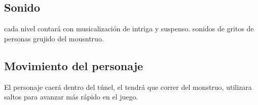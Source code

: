 \documentclass{article}
\begin{document}
\subsection{Sonido}
%
cada nivel contará con musicalización de intriga y suspenso.
sonidos de gritos de personas
grujido del mousntruo.

\subsection{Movimiento del personaje}
%
El personaje caerá dentro del túnel, el tendrá que correr del monstruo, utilizara saltos para avanzar más rápido en el juego.
\end{document}
